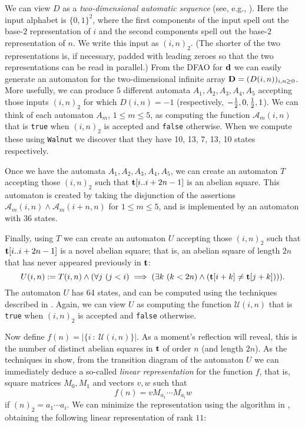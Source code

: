 \documentclass[11pt,reqno]{amsart}
\numberwithin{equation}{section}
\theoremstyle{plain}
\theoremstyle{definition}
\theoremstyle{remark}
\begin{document}
We can view $D$ as a {\it two-dimensional automatic sequence} 
(see, e.g., \cite[Chapter 14]{Allouche&Shallit:2003}).  Here the input
alphabet is $\lbrace 0,1\rbrace^2$, where the first components of the
input spell out the base-$2$ representation of $i$ and
the second components spell out the base-$2$ representation of $n$.
We write this input as $(i,n)_2$.
(The shorter of the two representations is, if necessary, padded with
leading zeroes so that the two representations can be read in parallel.)
From the DFAO for $\bf d$ we can easily generate an automaton
for the two-dimensional infinite array ${\bf D} = (D(i,n))_{i, n \geq 0}$.
More usefully, 
we can produce $5$ different automata
$A_1, A_2, A_3, A_4, A_5$ accepting
those inputs $(i,n)_2$ for which $D(i,n) =
-1$ (respectively, $-{1\over 2}, 0, {1 \over 2}, 1$). We can think of each
automaton $A_m$, $1 \leq m \leq 5$,
as computing the function ${\mathcal A}_m(i,n)$ that is {\tt true} when
$(i,n)_2$ is
accepted and {\tt false} otherwise.
When we compute
these using {\tt Walnut} we discover that they have 10, 13, 7, 13, 10
states respectively.

Once we have the automata 
$A_1, A_2, A_3, A_4, A_5$, we can create an automaton $T$ accepting
those $(i,n)_2$ such that ${\bf t}[i..i+2n-1]$ is an abelian square.  This
automaton is created by taking the disjunction
of the assertions ${\mathcal A}_m(i,n) \wedge {\mathcal A}_m(i+n,n)$ for $1 \leq m \leq 5$,
and is implemented by an automaton with 36 states.

Finally, using $T$ we can create an automaton $U$ accepting
those $(i,n)_2$ such that 
${\bf t}[i..i+2n-1]$ is a novel abelian square; that is,
an abelian square of length $2n$ that has never appeared previously
in $\bf t$:
$$U(i,n) := T(i,n) \wedge (\forall j\  (j<i) \implies (\exists k\ (k<2n) 
\wedge ({\bf t}[i+k]\not= {\bf t}[j+k]))) .$$
The automaton $U$ has 64 states, and can be computed using the techniques
described in \cite{Goc&Henshall&Shallit:2013}.  Again, we can view
$U$ as computing the function
${\mathcal U}(i,n)$ that is {\tt true} when
$(i,n)_2$ is accepted and {\tt false} otherwise.

Now define $f(n) = | \{ i \ : \ {\mathcal U}(i,n) \} |$.  As a moment's reflection
will reveal, this is the number of distinct abelian squares in $\bf t$
of order $n$ (and length $2n$).   As the techniques in 
\cite{Charlier&Rampersad&Shallit:2012} show, from the transition diagram of
the automaton $U$ we can immediately deduce a so-called {\it linear representation}
for the function $f$,
that is, square matrices
$M_0, M_1$ and vectors $v, w$ such that
$$ f(n) = v M_{a_1} \cdots M_{a_i} w $$
if $(n)_2 = a_1 \cdots a_i$.  
We can minimize the representation using the algorithm in \cite[Section~2.3]{Berstel&Reutenauer:2011}, obtaining
the following linear representation of rank $11$:
\end{document}
